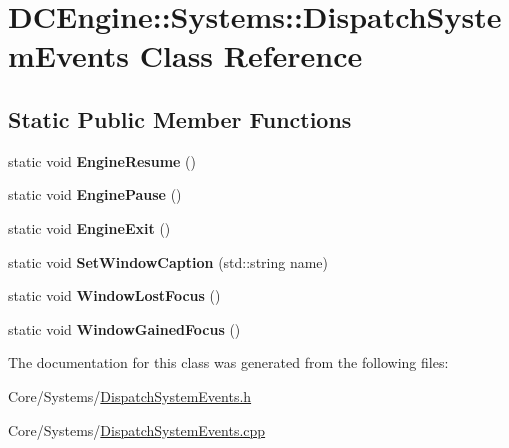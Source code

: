 \hypertarget{classDCEngine_1_1Systems_1_1DispatchSystemEvents}{\section{D\-C\-Engine\-:\-:Systems\-:\-:Dispatch\-System\-Events Class Reference}
\label{classDCEngine_1_1Systems_1_1DispatchSystemEvents}
}
\subsection*{Static Public Member Functions}
\begin{DoxyCompactItemize}
\item 
\hypertarget{classDCEngine_1_1Systems_1_1DispatchSystemEvents_a3d48623341b59addca47769faee76a81}{static void {\bfseries Engine\-Resume} ()}\label{classDCEngine_1_1Systems_1_1DispatchSystemEvents_a3d48623341b59addca47769faee76a81}

\item 
\hypertarget{classDCEngine_1_1Systems_1_1DispatchSystemEvents_aaee95eb74012a746d7302a5138f8fb82}{static void {\bfseries Engine\-Pause} ()}\label{classDCEngine_1_1Systems_1_1DispatchSystemEvents_aaee95eb74012a746d7302a5138f8fb82}

\item 
\hypertarget{classDCEngine_1_1Systems_1_1DispatchSystemEvents_ab16d23e0cafd613b91718b40f485ff3d}{static void {\bfseries Engine\-Exit} ()}\label{classDCEngine_1_1Systems_1_1DispatchSystemEvents_ab16d23e0cafd613b91718b40f485ff3d}

\item 
\hypertarget{classDCEngine_1_1Systems_1_1DispatchSystemEvents_a7995d16f3445bb72d8511ef4b71a1a93}{static void {\bfseries Set\-Window\-Caption} (std\-::string name)}\label{classDCEngine_1_1Systems_1_1DispatchSystemEvents_a7995d16f3445bb72d8511ef4b71a1a93}

\item 
\hypertarget{classDCEngine_1_1Systems_1_1DispatchSystemEvents_a7a90d3d900947bf3d792cffdfac645ac}{static void {\bfseries Window\-Lost\-Focus} ()}\label{classDCEngine_1_1Systems_1_1DispatchSystemEvents_a7a90d3d900947bf3d792cffdfac645ac}

\item 
\hypertarget{classDCEngine_1_1Systems_1_1DispatchSystemEvents_aea967101dc7c1e8432804806549c195b}{static void {\bfseries Window\-Gained\-Focus} ()}\label{classDCEngine_1_1Systems_1_1DispatchSystemEvents_aea967101dc7c1e8432804806549c195b}

\end{DoxyCompactItemize}


The documentation for this class was generated from the following files\-:\begin{DoxyCompactItemize}
\item 
Core/\-Systems/\hyperlink{DispatchSystemEvents_8h}{Dispatch\-System\-Events.\-h}\item 
Core/\-Systems/\hyperlink{DispatchSystemEvents_8cpp}{Dispatch\-System\-Events.\-cpp}\end{DoxyCompactItemize}
